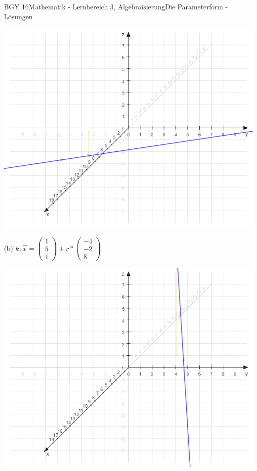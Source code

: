 \documentclass[oneside,openany,headings=optiontotoc,11pt,numbers=noenddot]{scrreprt}
\begin{document}
\begin{worksheet}{BGY 16}{Mathematik - Lernbereich 3, Algebraisierung}{Die Parameterform - Lösungen}
\begin{framed}
			\begin{center}
				\includegraphics[scale=0.4]{Bilder/g3DKoord.png}
			\end{center}
			\noindent
			\tiny{\color{codegray}(b) \(k: \vec{x} = \left(\begin{array}{c}1\\5\\1\end{array}\right) + r* \left(\begin{array}{c}-4\\-2\\8\end{array}\right)\)}
			\begin{center}
				\includegraphics[scale=0.4]{Bilder/k3DKoord.png}
			\end{center}
		\end{framed}
	\end{worksheet}
\end{document}
